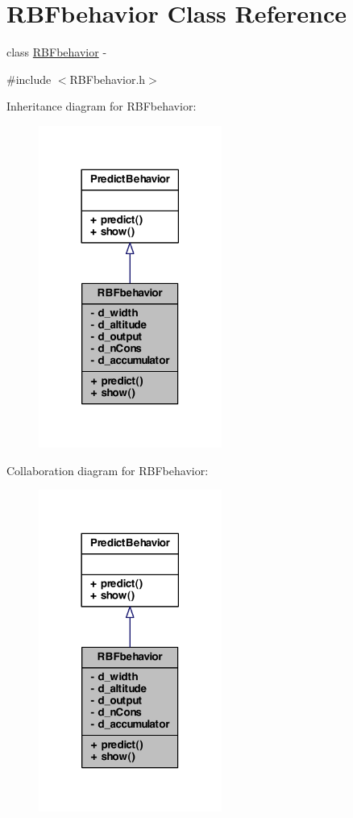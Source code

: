 \hypertarget{class_r_b_fbehavior}{
\section{RBFbehavior Class Reference}
\label{class_r_b_fbehavior}
}


class \hyperlink{class_r_b_fbehavior}{RBFbehavior} -\/  




{\ttfamily \#include $<$RBFbehavior.h$>$}



Inheritance diagram for RBFbehavior:
\nopagebreak
\begin{figure}[H]
\begin{center}
\leavevmode
\includegraphics[width=170pt]{class_r_b_fbehavior__inherit__graph}
\end{center}
\end{figure}


Collaboration diagram for RBFbehavior:
\nopagebreak
\begin{figure}[H]
\begin{center}
\leavevmode
\includegraphics[width=170pt]{class_r_b_fbehavior__coll__graph}
\end{center}
\end{figure}
